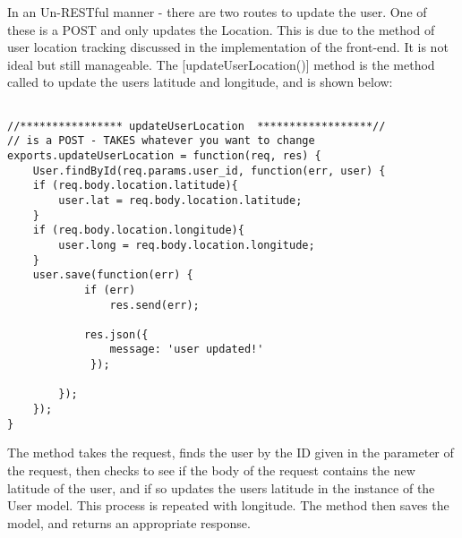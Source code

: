 \documentclass[a4paper]{article}
\begin{document}
In an Un-RESTful manner - there are two routes to update the user. One of these is a POST and only updates the Location. This is due to the method of user location tracking discussed in the implementation of the front-end. It is not ideal but still manageable. The [updateUserLocation()] method is the method called to update the users latitude and longitude, and is shown below:
\begin{lstlisting}[label=Update the user location,caption=Update the user location]

//**************** updateUserLocation  ******************//
// is a POST - TAKES whatever you want to change
exports.updateUserLocation = function(req, res) {
    User.findById(req.params.user_id, function(err, user) {
    if (req.body.location.latitude){
        user.lat = req.body.location.latitude; 
    }
    if (req.body.location.longitude){
        user.long = req.body.location.longitude; 
    }
    user.save(function(err) {
            if (err)
                res.send(err);

            res.json({
                message: 'user updated!'
             });
             
        });
    });
}
\end{lstlisting} 

The method takes the request, finds the user by the ID given in the parameter of the request, then checks to see if the body of the request contains the new latitude of the user, and if so updates the users latitude in the instance of the User model.
This process is repeated with longitude.
The method then saves the model, and returns an appropriate response.
\end{document}

